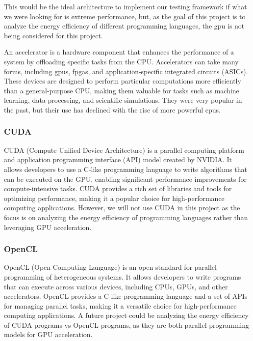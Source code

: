 This would be the ideal architecture to implement our testing framework if what we were looking for is extreme performance, but, as the goal of this project is to analyze the energy efficiency of different programming languages, the \gls{gpu} is not being considered for this project. 

An accelerator is a hardware component that enhances the performance of a system by offloading specific tasks from the CPU. Accelerators can take many forms, including \glspl{gpu}, \glspl{fpga}, and application-specific integrated circuits (ASICs). These devices are designed to perform particular computations more efficiently than a general-purpose CPU, making them valuable for tasks such as machine learning, data processing, and scientific simulations. They were very popular in the past, but their use has declined with the rise of more powerful \Glspl{cpu}.

\subsubsection{CUDA}
\label{sec:cuda}
CUDA (Compute Unified Device Architecture) is a parallel computing platform and application programming interface (API) model created by NVIDIA. It allows developers to use a C-like programming language to write algorithms that can be executed on the GPU, enabling significant performance improvements for compute-intensive tasks. CUDA provides a rich set of libraries and tools for optimizing performance, making it a popular choice for high-performance computing applications. However, we will not use CUDA in this project as the focus is on analyzing the energy efficiency of programming languages rather than leveraging GPU acceleration. 
\subsubsection{OpenCL}
\label{sec:opencl}
OpenCL (Open Computing Language) is an open standard for parallel programming of heterogeneous systems. It allows developers to write programs that can execute across various devices, including CPUs, GPUs, and other accelerators. OpenCL provides a C-like programming language and a set of APIs for managing parallel tasks, making it a versatile choice for high-performance computing applications. A future project could be analyzing the energy efficiency of CUDA programs vs OpenCL programs, as they are both parallel programming models for GPU acceleration.



